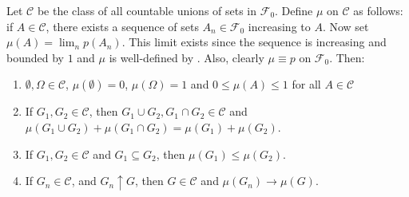 \begin{lemm}\label{lemma:extension to monotone class} Let \(\mathcal{C}\) be the class
of all countable unions of sets in \(\mathcal{F}_0\). Define
\(\mu\) on \(\mathcal{C}\) as follows: if \(A\in\mathcal{C}\), there exists a sequence of sets
\(A_n\in\mathcal{F}_0\) increasing to \(A\). Now set  \(\mu(A)=\lim_n p(A_n)\). This
limit exists since the sequence is increasing and bounded by \(1\) and \(\mu\)
is well-defined by .  Also,
clearly \(\mu\equiv p\) on \(\mathcal{F}_0\). Then:
	\begin{enumerate}
		\item \label{lemma:extension to monotone class
coincides}\(\emptyset,\Omega\in\mathcal{C}\), \(\mu(\emptyset)=0\), \(\mu(\Omega)=1\) and
\(0\leq\mu(A)\leq1\) for all \(A\in\mathcal{C}\)
		\item \label{lemma:extension to monotone class additivity} If
\(G_1,G_2\in\mathcal{C}\), then \(G_1\cup G_2,G_1\cap G_2\in\mathcal{C}\) and
\(\mu(G_1\cup G_2)+\mu(G_1\cap G_2)=\mu(G_1)+\mu(G_2)\).
		\item \label{lemma:extension to monotone class is monotone} If
\(G_1,G_2\in\mathcal{C}\) and \(G_1\subseteq G_2\), then \(\mu(G_1)\leq\mu(G_2)\).
		\item \label{lemma:extension to monotone class incerasing limits} If
\(G_n\in\mathcal{C}\), and \(G_n\uparrow G\), then \(G\in\mathcal{C}\) and
\(\mu(G_n)\to\mu(G)\).
	\end{enumerate}
\end{lemm}
